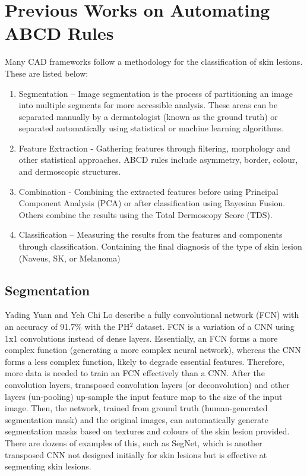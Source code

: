 \section{Previous Works on Automating ABCD Rules}
Many CAD frameworks follow a methodology for the classification of skin lesions. These are listed below:

\begin{enumerate}
	
	\item Segmentation – Image segmentation is the process of partitioning an image into multiple segments for more accessible analysis. These areas can be separated manually by a dermatologist (known as the ground truth) or separated automatically using statistical or machine learning algorithms.
	
	\item Feature Extraction - Gathering features through filtering, morphology and other statistical approaches. ABCD rules include asymmetry, border, colour, and dermoscopic structures.

	\item Combination - Combining the extracted features before using Principal Component Analysis (PCA) or after classification using Bayesian Fusion. Others combine the results using the Total Dermoscopy Score (TDS).
	
	\item Classification – Measuring the results from the features and components through classification. Containing the final diagnosis of the type of skin lesion (Naveus, SK, or Melanoma)

\end{enumerate}

\subsection{Segmentation}
Yading Yuan and Yeh Chi Lo describe a fully convolutional network (FCN) with an accuracy of 91.7\% with the PH$^2$ dataset\cite{Yuan2017a}. FCN is a variation of a CNN using 1x1 convolutions instead of dense layers. Essentially, an FCN forms a more complex function (generating a more complex neural network), whereas the CNN forms a less complex function, likely to degrade essential features. Therefore, more data is needed to train an FCN effectively than a CNN. After the convolution layers, transposed convolution layers (or deconvolution) and other layers (un-pooling) up-sample the input feature map to the size of the input image. Then, the network, trained from ground truth (human-generated segmentation mask) and the original images, can automatically generate segmentation masks based on textures and colours of the skin lesion provided. There are dozens of examples of this, such as SegNet\cite{Badrinarayanan2017}, which is another transposed CNN not designed initially for skin lesions but is effective at segmenting skin lesions.

